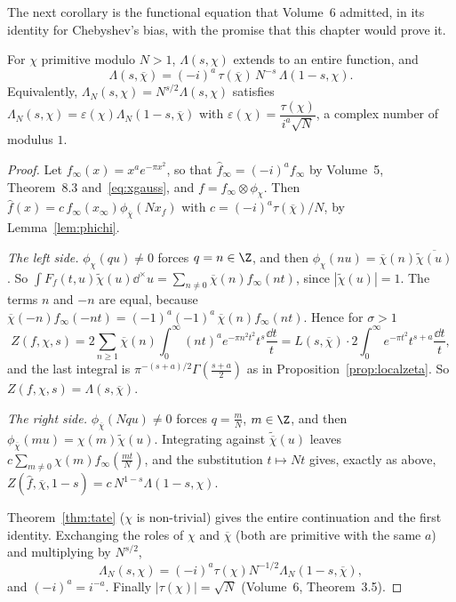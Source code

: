 The next corollary is the functional equation that Volume~6 admitted, in its identity for Chebyshev's bias, with the promise
that this chapter would prove it.

\begin{corollary}\label{cor:dirichletFE}
For $\chi$ primitive modulo $N>1$, $\Lambda(s,\chi)$ extends to an entire function, and
\[
\Lambda(s,\overline\chi)=(-i)^a\,\tau(\overline\chi)\,N^{-s}\,\Lambda(1-s,\chi).
\]
Equivalently, $\Lambda_N(s,\chi)=N^{s/2}\Lambda(s,\chi)$ satisfies $\Lambda_N(s,\chi)=\varepsilon(\chi)\Lambda_N(1-s,\overline\chi)$ with
$\varepsilon(\chi)=\dfrac{\tau(\chi)}{i^a\sqrt N}$, a complex number of modulus $1$.
\end{corollary}
\begin{proof}
Let $f_\infty(x)=x^ae^{-\pi x^2}$, so that $\hat f_\infty=(-i)^af_\infty$ by Volume~5, Theorem~8.3 and~\eqref{eq:xgauss}, and $f=f_\infty\otimes\phi_\chi$.
Then $\hat f(x)=c\,f_\infty(x_\infty)\phi_{\overline\chi}(Nx_f)$ with $c=(-i)^a\tau(\overline\chi)/N$, by Lemma~\ref{lem:phichi}.

\emph{The left side.} $\phi_\chi(qu)\ne0$ forces $q=n\in\Z$, and then $\phi_\chi(nu)=\overline\chi(n)\overline{\tilde\chi(u)}$. So
$\int F_f(t,u)\tilde\chi(u)\dd^\times u=\sum_{n\ne0}\overline\chi(n)f_\infty(nt)$, since $|\tilde\chi(u)|=1$. The terms $n$ and $-n$ are equal, because
$\overline\chi(-n)f_\infty(-nt)=(-1)^a(-1)^a\,\overline\chi(n)f_\infty(nt)$. Hence for $\sigma>1$
\[
Z(f,\chi,s)=2\sum_{n\ge1}\overline\chi(n)\int_0^\infty(nt)^ae^{-\pi n^2t^2}t^s\frac{\dd t}t=L(s,\overline\chi)\cdot2\int_0^\infty e^{-\pi t^2}t^{s+a}\frac{\dd t}t,
\]
and the last integral is $\pi^{-(s+a)/2}\Gamma(\frac{s+a}2)$ as in Proposition~\ref{prop:localzeta}. So $Z(f,\chi,s)=\Lambda(s,\overline\chi)$.

\emph{The right side.} $\phi_{\overline\chi}(Nqu)\ne0$ forces $q=\frac mN$, $m\in\Z$, and then $\phi_{\overline\chi}(mu)=\chi(m)\tilde\chi(u)$. Integrating against
$\tilde{\overline\chi}(u)$ leaves $c\sum_{m\ne0}\chi(m)f_\infty(\frac{mt}N)$, and the substitution $t\mapsto Nt$ gives, exactly as above,
$Z(\hat f,\overline\chi,1-s)=c\,N^{1-s}\Lambda(1-s,\chi)$.

Theorem~\ref{thm:tate} ($\chi$ is non-trivial) gives the entire continuation and the first identity. Exchanging the roles of $\chi$
and $\overline\chi$ (both are primitive with the same $a$) and multiplying by $N^{s/2}$,
\[
\Lambda_N(s,\chi)=(-i)^a\tau(\chi)N^{-1/2}\Lambda_N(1-s,\overline\chi),
\]
and $(-i)^a=i^{-a}$. Finally $|\tau(\chi)|=\sqrt N$ (Volume~6, Theorem~3.5).
\end{proof}

